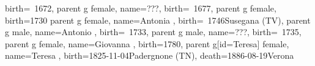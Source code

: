 \documentclass{article}
\begin{document}
\begin{midpage}
\begin{center}
\begin{genealogypicture}
{{{{{{{{{{{{{                                                    birth={~1672}{},
                                                }
                                            }
                                            parent{
                                                g{
                                                    female,
                                                    name={???},
                                                    birth={~1677}{},
                                                }
                                            }
                                        }
                                    }
                                    parent{
                                        g{
                                            female,
                                            birth={1730}{}
                                        }
                                    }
                                }
                                parent{
                                    g{
                                        female,
                                        name={Antonia },
                                        birth={~1746}{Susegana (TV)},
                                    }
                                    parent{
                                        g{
                                            male,
                                            name={Antonio },
                                            birth={~1733}{},
                                        }
                                    }
                                    parent{
                                        g{
                                            male,
                                            name={???},
                                            birth={~1735}{},
                                        }
                                    }
                                }
                            }
                            parent{
                                g{
                                    female,
                                    name={Giovanna },
                                    birth={1780}{},
                                }
                            }
                        }
                    }
                    parent{
                        g[id=Teresa]{
                            female,
                            name={Teresa },
                            birth={1825-11-04}{Padergnone (TN)},
                            death={1886-08-19}{Verona}
}}}}}}}
\end{genealogypicture}
\end{center}
\end{midpage}
\end{document}
